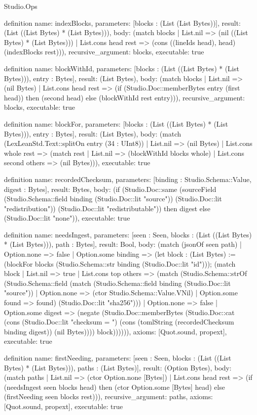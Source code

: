 \begin{lexlean}{Studio.Ops}
\begin{semanticmodule}
{definition{
  name: indexBlocks,
  parameters: [blocks : (List (List Bytes))],
  result: (List ((List Bytes) * (List Bytes))),
  body: (match blocks
    | List.nil => (nil ((List Bytes) * (List Bytes)))
    | List.cons head rest => (cons ((lineIds head), head) (indexBlocks rest))),
  recursive_argument: blocks,
  executable: true
}

definition{
  name: blockWithId,
  parameters: [blocks : (List ((List Bytes) * (List Bytes))), entry : Bytes],
  result: (List Bytes),
  body: (match blocks
    | List.nil => (nil Bytes)
    | List.cons head rest => (if (Studio.Doc::memberBytes entry (first head)) then (second head) else (blockWithId rest entry))),
  recursive_argument: blocks,
  executable: true
}

definition{
  name: blockFor,
  parameters: [blocks : (List ((List Bytes) * (List Bytes))), entry : Bytes],
  result: (List Bytes),
  body: (match (LexLeanStd.Text::splitOn entry (34 : UInt8))
    | List.nil => (nil Bytes)
    | List.cons whole rest => (match rest
      | List.nil => (blockWithId blocks whole)
      | List.cons second others => (nil Bytes))),
  executable: true
}

definition{
  name: recordedChecksum,
  parameters: [binding : Studio.Schema::Value, digest : Bytes],
  result: Bytes,
  body: (if (Studio.Doc::same (sourceField (Studio.Schema::field binding (Studio.Doc::lit "source")) (Studio.Doc::lit "redistribution")) (Studio.Doc::lit "redistributable")) then digest else (Studio.Doc::lit "none")),
  executable: true
}

definition{
  name: needsIngest,
  parameters: [seen : Seen, blocks : (List ((List Bytes) * (List Bytes))), path : Bytes],
  result: Bool,
  body: (match (jsonOf seen path)
    | Option.none => false
    | Option.some binding => (let block : (List Bytes) := (blockFor blocks (Studio.Schema::str binding (Studio.Doc::lit "id"))); (match block
      | List.nil => true
      | List.cons top others => (match (Studio.Schema::strOf (Studio.Schema::field (match (Studio.Schema::field binding (Studio.Doc::lit "source"))
          | Option.none => (ctor Studio.Schema::Value.VNil)
          | Option.some found => found) (Studio.Doc::lit "sha256")))
        | Option.none => false
        | Option.some digest => (negate (Studio.Doc::memberBytes (Studio.Doc::cat (cons (Studio.Doc::lit "checksum = ") (cons (tomlString (recordedChecksum binding digest)) (nil Bytes)))) block)))))),
  axioms: [Quot.sound, propext],
  executable: true
}

definition{
  name: firstNeeding,
  parameters: [seen : Seen, blocks : (List ((List Bytes) * (List Bytes))), paths : (List Bytes)],
  result: (Option Bytes),
  body: (match paths
    | List.nil => (ctor Option.none [Bytes])
    | List.cons head rest => (if (needsIngest seen blocks head) then (ctor Option.some [Bytes] head) else (firstNeeding seen blocks rest))),
  recursive_argument: paths,
  axioms: [Quot.sound, propext],
  executable: true
}

}
\end{semanticmodule}
\end{lexlean}
